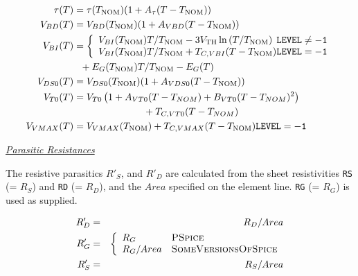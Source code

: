 ~

\begin{align}
\tau(T) &= \tau(T_{\ms{NOM}})(1 + A_{\tau}(T-T_{\ms{NOM}} )) \\
V_{BD}(T) &= V_{BD}(T_{\ms{NOM}})(1 + A_{VBD}(T-T_{\ms{NOM}} )) \\
V_{BI} (T) & =  \left\{ \begin{array}{l}
 V_{BI}(T_{\ms{NOM}}) {T / {T_{\ms{NOM}}}}
 - 3V_{\ms{TH}} \ln{\left( {{T} / {T_{\ms{NOM}}}}\right) }
        \hfill {\tt LEVEL \ne -1} \\
 V_{BI}(T_{\ms{NOM}}) {T / {T_{\ms{NOM}}}}
+ T_{C,VBI}({T- T_{\ms{NOM}}})
        \hfill {\tt LEVEL = -1} \\
                         \end{array} \right.   %
 \nonumber\\
           & ~~+ E_G (T_{\ms{NOM}}) {T / {T_{\ms{NOM}}}} -E_G(T)\\
V_{DS0}(T) &= V_{DS0}(T_{\ms{NOM}})(1 + A_{VDS0}(T-T_{\ms{NOM}} ))\\
V_{T0}(T)&=V_{T0} \left( 1 + A_{VT0}(T- T_{NOM})
                            + B_{VT0}(T- T_{NOM})^2 \right)\nonumber\\
            &\hspace*{1in} + T_{C,VT0}(T- T_{NOM})\\
 V_{VMAX}(T)&=V_{VMAX}(T_{\ms{NOM}}) + T_{C,VMAX}({T- T_{\ms{NOM}}})
        \hfill {\tt LEVEL = -1}
\end{align}

\noindent\underline{\sl \large Parasitic Resistances}\\[0.1in]

The resistive parasitics
$R'_S$, and $R'_D$ are calculated from the sheet resistivities
{\tt RS} (= $R_S$) and {\tt RD} (= $R_D$), and the
$Area$ specified on the element line.
{\tt RG} (= $R_G$) is used as supplied.

\begin{eqnarray}
R'_D & = & R_D/Area\\
R'_G & = & \left\{ \begin{array}{ll}
                   R_G      & \mbox{\pspice}\\
                   R_G/Area & \mbox{\sspice}
              \end{array}\right. %
\\
R'_S & = & R_S/Area
\end{eqnarray}

